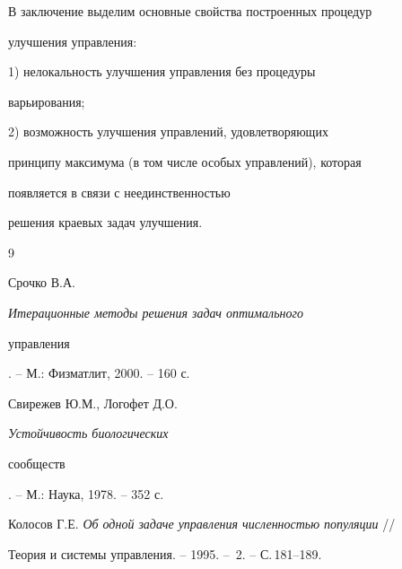 В заключение выделим основные свойства построенных процедур


улучшения управления:





1) нелокальность улучшения управления без процедуры


варьирования;


2) возможность улучшения управлений, удовлетворяющих


принципу максимума (в том числе особых управлений), которая


появляется в связи с неединственностью


решения краевых задач улучшения. 








\begin{thebibliography}{9}







Срочко В.А. {\em Итерационные методы решения задач оптимального 


управления}. -- М.: Физ\-мат\-лит, 2000. -- 160 с.




Свирежев Ю.М., Логофет Д.О. {\em Устойчивость биологических 


сообществ}. -- М.: Наука, 1978. -- 352 с.




Колосов Г.Е. {\em Об одной задаче управления численностью популяции} // 


Теория и системы управления. -- 1995. -- \No\,2. -- С.\,181--189.





\end{thebibliography}





\vskip 1cm












\label{end}








